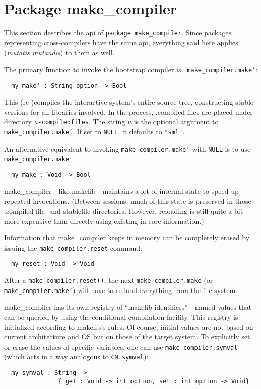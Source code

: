 
\section{Package make_compiler}

This section describes the api of {\tt package make_compiler}.  Since
packages representing cross-compilers have the same api,
everything said here applies ({\em mutatis mutandis}) to them as well.

The primary function to invoke the bootstrap compiler is {\tt
make_compiler.make'}:

\begin{verbatim}
  my make' : String option -> Bool
\end{verbatim}

This (re-)compiles the interactive system's entire source tree,
constructing stable versions for all libraries involved.  In the
process, .compiled files are placed under directory {\tt $u$-compiledfiles}.
The string $u$ is
the optional argument to {\tt make_compiler.make'}.  If set to {\tt NULL}, it
defaults to \verb|"sml"|.

An alternative equivalent to invoking {\tt make_compiler.make'} with {\tt NULL}
is to use {\tt make_compiler.make}:

\begin{verbatim}
  my make : Void -> Bool
\end{verbatim}

make_compiler---like makelib---maintains a lot of internal state to speed up repeated
invocations.  (Between sessions, much of this state is preserved in
those .compiled file- and stablefile-directories.  However, reloading is
still quite a bit more expensive than directly using existing in-core
information.)

Information that make_compiler keeps in memory can be completely erased by
issuing the {\tt make_compiler.reset} command:

\begin{verbatim}
  my reset : Void -> Void
\end{verbatim}

After a {\tt make_compiler.reset()}, the next {\tt make_compiler.make} (or {\tt make_compiler.make'})
will have to re-load everything from the file system.

make_compiler has its own registry of ``makelib identifiers''---named values that can
be queried by using the conditional compilation facility.  This
registry is initialized according to makelib's rules. Of course, initial
values are not based on current architecture and OS but on those of the
target system.  To explicitly set or erase the values of specific
variables, one can use {\tt make_compiler.symval} (which acts in a way analogous
to {\tt CM.symval}):

\begin{verbatim}
  my symval : String ->
               { get : Void -> int option, set : int option -> Void}
\end{verbatim}
